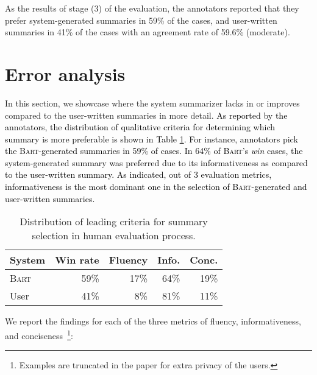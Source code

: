 \documentclass[10pt, a4paper]{article}
\newcommand{\bart}{\textsc{Bart}}
\begin{document}
As the results of stage (3) of the evaluation, the annotators reported that they  prefer system-generated summaries in 59\% of the cases, and user-written summaries in 41\% of the cases with an agreement rate of 59.6\% (moderate). 


\section{Error analysis}
\label{sec:error_anal}

In this section, we showcase where the system summarizer lacks in or improves compared to the user-written summaries in more detail.  \textcolor{black}{As reported by the annotators, the distribution of qualitative criteria for determining which summary is more preferable is shown in Table \ref{tab:criteria_selection}. For instance, annotators pick the \bart-generated summaries in 59\% of cases. In 64\% of \bart 's \textit{win} cases, the system-generated summary was preferred due to its informativeness as compared to the user-written summary. As indicated, out of 3 evaluation metrics, informativeness is the most dominant one in the selection of \bart -generated and user-written summaries.} 

\begin{table}[t]
    \centering
\begin{tabular}{lrrrr}
    \toprule
         System & Win rate & Fluency & Info. & Conc.  \\
         \midrule
         \bart{}  & 59\% & 17\%& 64\%& 19\%\\
         User & 41\% & 8\%& 81\%& 11\%\\
    \bottomrule
    \end{tabular}
\caption{Distribution of leading criteria for summary selection in human evaluation process.}
    \label{tab:criteria_selection}
\end{table}





We report the findings for each of the three metrics of fluency, informativeness, and conciseness~\footnote{Examples are truncated in the paper for extra privacy of the users.}: 
\end{document}
